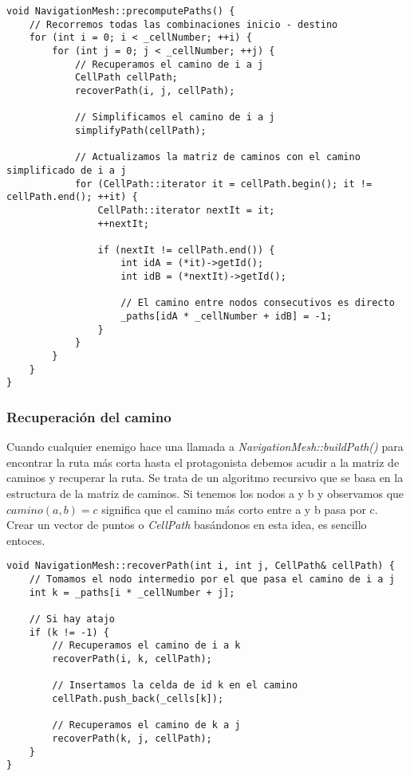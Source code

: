 \begin{lstlisting}[style=C++]
void NavigationMesh::precomputePaths() {    
    // Recorremos todas las combinaciones inicio - destino
    for (int i = 0; i < _cellNumber; ++i) {
        for (int j = 0; j < _cellNumber; ++j) {
            // Recuperamos el camino de i a j
            CellPath cellPath;
            recoverPath(i, j, cellPath);
            
            // Simplificamos el camino de i a j
            simplifyPath(cellPath);
            
            // Actualizamos la matriz de caminos con el camino simplificado de i a j 
            for (CellPath::iterator it = cellPath.begin(); it != cellPath.end(); ++it) {
                CellPath::iterator nextIt = it;
                ++nextIt;

                if (nextIt != cellPath.end()) {
                    int idA = (*it)->getId();
                    int idB = (*nextIt)->getId();
                    
                    // El camino entre nodos consecutivos es directo
                    _paths[idA * _cellNumber + idB] = -1;
                }
            }
        }
    }
}
\end{lstlisting}

\subsubsection{Recuperación del camino}

Cuando cualquier enemigo hace una llamada a \textit{NavigationMesh::buildPath()}
para encontrar la ruta más corta hasta el protagonista debemos acudir a la
matriz de caminos y recuperar la ruta. Se trata de un algoritmo recursivo
que se basa en la estructura de la matriz de caminos. Si tenemos los nodos
a y b y observamos que $camino(a, b) = c$ significa que el camino más corto
entre a y b pasa por c. Crear un vector de puntos o \textit{CellPath} basándonos
en esta idea, es sencillo entoces.

\begin{lstlisting}[style=C++]
void NavigationMesh::recoverPath(int i, int j, CellPath& cellPath) {
    // Tomamos el nodo intermedio por el que pasa el camino de i a j
    int k = _paths[i * _cellNumber + j];
    
    // Si hay atajo
    if (k != -1) {
        // Recuperamos el camino de i a k
        recoverPath(i, k, cellPath);
        
        // Insertamos la celda de id k en el camino
        cellPath.push_back(_cells[k]);
        
        // Recuperamos el camino de k a j
        recoverPath(k, j, cellPath);
    }
}
\end{lstlisting}

